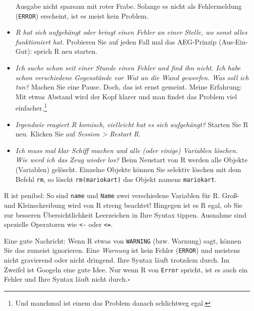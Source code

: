 \documentclass[
  a4paper,
  DIV=11]{scrreprt}
\theoremstyle{definition}
\theoremstyle{definition}
\theoremstyle{definition}
\theoremstyle{remark}
\begin{document}
\begin{itemize}
  Ausgabe nicht sparsam mit roter Frabe. Solange es nicht als
  Fehlermeldung (\texttt{ERROR}) erscheint, ist es meist kein Problem.
\item
  \emph{R hat sich aufgehängt oder bringt einen Fehler an einer Stelle,
  wo sonst alles funktioniert hat.} Probieren Sie auf jeden Fall mal das
  AEG-Prinzip (Aus-Ein-Gut): sprich R neu starten.
\item
  \emph{Ich suche schon seit einer Stunde einen Fehler und find ihn
  nicht. Ich habe schon verschiedene Gegenstände vor Wut an die Wand
  geworfen. Was soll ich tun?} Machen Sie eine Pause. Doch, das ist
  ernst gemeint. Meine Erfahrung: Mit etwas Abstand wird der Kopf klarer
  und man findet das Problem viel einfacher.\footnote{Und manchmal ist
    einem das Problem danach schlichtweg egal.}
\item
  \emph{Irgendwie reagiert R komisch, vielleicht hat es sich
  aufgehängt?} Starten Sie R neu. Klicken Sie auf \emph{Session
  \textgreater{} Restart R}.
\item
  \emph{Ich muss mal klar Schiff machen und alle (oder einige) Variablen
  löschen. Wie werd ich das Zeug wieder los?} Beim Neustart von R werden
  alle Objekte (Variablen) gelöscht. Einzelne Objekte können Sie
  selektiv löschen mit dem Befehl \texttt{rm}, so löscht
  \texttt{rm(mariokart)} das Objekt namens \texttt{mariokart}.
\end{itemize}

\begin{tcolorbox}[enhanced jigsaw, leftrule=.75mm, opacitybacktitle=0.6, colback=white, colframe=quarto-callout-caution-color-frame, coltitle=black, colbacktitle=quarto-callout-caution-color!10!white, opacityback=0, left=2mm, breakable, titlerule=0mm, toptitle=1mm, bottomtitle=1mm, rightrule=.15mm, title=\textcolor{quarto-callout-caution-color}{\faFire}\hspace{0.5em}{Vorsicht}, arc=.35mm, bottomrule=.15mm, toprule=.15mm]

R ist penibel: So sind \texttt{name} und \texttt{Name} zwei verschiedene
Variablen für R. Groß- und Kleinschreibung wird von R streng beachtet!
Hingegen ist es R egal, ob Sie zur besseren Übersichtlichkeit
Leerzeichen in Ihre Syntax tippen. Ausnahme sind spezielle Operatoren
wie \texttt{\textless{}-} oder \texttt{\textless{}=}.

Eine gute Nachricht: Wenn R etwas von \texttt{WARNING} (bzw. Warnung)
sagt, können Sie das zumeist ignorieren. Eine \emph{Warnung} ist kein
Fehler (\texttt{ERROR}) und meistens nicht gravierend oder nicht
dringend. Ihre Syntax läuft trotzdem durch. Im Zweifel ist Googeln eine
gute Idee. Nur wenn R von \texttt{Error} spricht, ist es auch ein Fehler
und Ihre Syntax läuft nicht durch.\(\square\)

\end{tcolorbox}
\end{document}

